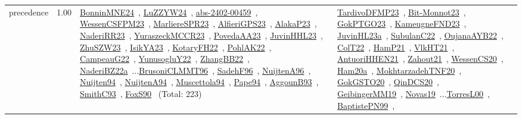 {\begin{longtable}{p{3cm}r>{\raggedright\arraybackslash}p{6cm}>{\raggedright\arraybackslash}p{6cm}>{\raggedright\arraybackslash}p{8cm}}
\index{precedence}\index{Concepts!precedence}precedence &  1.00 & \href{../works/BonninMNE24.pdf}{BonninMNE24}~\cite{BonninMNE24}, \href{../works/LuZZYW24.pdf}{LuZZYW24}~\cite{LuZZYW24}, \href{../works/abs-2402-00459.pdf}{abs-2402-00459}~\cite{abs-2402-00459}, \href{../works/WessenCSFPM23.pdf}{WessenCSFPM23}~\cite{WessenCSFPM23}, \href{../works/MarliereSPR23.pdf}{MarliereSPR23}~\cite{MarliereSPR23}, \href{../works/AlfieriGPS23.pdf}{AlfieriGPS23}~\cite{AlfieriGPS23}, \href{../works/AlakaP23.pdf}{AlakaP23}~\cite{AlakaP23}, \href{../works/NaderiRR23.pdf}{NaderiRR23}~\cite{NaderiRR23}, \href{../works/YuraszeckMCCR23.pdf}{YuraszeckMCCR23}~\cite{YuraszeckMCCR23}, \href{../works/PovedaAA23.pdf}{PovedaAA23}~\cite{PovedaAA23}, \href{../works/JuvinHHL23.pdf}{JuvinHHL23}~\cite{JuvinHHL23}, \href{../works/ZhuSZW23.pdf}{ZhuSZW23}~\cite{ZhuSZW23}, \href{../works/IsikYA23.pdf}{IsikYA23}~\cite{IsikYA23}, \href{../works/KotaryFH22.pdf}{KotaryFH22}~\cite{KotaryFH22}, \href{../works/PohlAK22.pdf}{PohlAK22}~\cite{PohlAK22}, \href{../works/CampeauG22.pdf}{CampeauG22}~\cite{CampeauG22}, \href{../works/YunusogluY22.pdf}{YunusogluY22}~\cite{YunusogluY22}, \href{../works/ZhangBB22.pdf}{ZhangBB22}~\cite{ZhangBB22}, \href{../works/NaderiBZ22a.pdf}{NaderiBZ22a}~\cite{NaderiBZ22a}...\href{../works/BrusoniCLMMT96.pdf}{BrusoniCLMMT96}~\cite{BrusoniCLMMT96}, \href{../works/SadehF96.pdf}{SadehF96}~\cite{SadehF96}, \href{../works/NuijtenA96.pdf}{NuijtenA96}~\cite{NuijtenA96}, \href{../works/Nuijten94.pdf}{Nuijten94}~\cite{Nuijten94}, \href{../works/NuijtenA94.pdf}{NuijtenA94}~\cite{NuijtenA94}, \href{../works/Muscettola94.pdf}{Muscettola94}~\cite{Muscettola94}, \href{../works/Pape94.pdf}{Pape94}~\cite{Pape94}, \href{../works/AggounB93.pdf}{AggounB93}~\cite{AggounB93}, \href{../works/SmithC93.pdf}{SmithC93}~\cite{SmithC93}, \href{../works/FoxS90.pdf}{FoxS90}~\cite{FoxS90} (Total: 223) & \href{../works/TardivoDFMP23.pdf}{TardivoDFMP23}~\cite{TardivoDFMP23}, \href{../works/Bit-Monnot23.pdf}{Bit-Monnot23}~\cite{Bit-Monnot23}, \href{../works/GokPTGO23.pdf}{GokPTGO23}~\cite{GokPTGO23}, \href{../works/KameugneFND23.pdf}{KameugneFND23}~\cite{KameugneFND23}, \href{../works/JuvinHL23a.pdf}{JuvinHL23a}~\cite{JuvinHL23a}, \href{../works/SubulanC22.pdf}{SubulanC22}~\cite{SubulanC22}, \href{../works/OujanaAYB22.pdf}{OujanaAYB22}~\cite{OujanaAYB22}, \href{../works/ColT22.pdf}{ColT22}~\cite{ColT22}, \href{../works/HamP21.pdf}{HamP21}~\cite{HamP21}, \href{../works/VlkHT21.pdf}{VlkHT21}~\cite{VlkHT21}, \href{../works/AntuoriHHEN21.pdf}{AntuoriHHEN21}~\cite{AntuoriHHEN21}, \href{../works/Zahout21.pdf}{Zahout21}~\cite{Zahout21}, \href{../works/WessenCS20.pdf}{WessenCS20}~\cite{WessenCS20}, \href{../works/Ham20a.pdf}{Ham20a}~\cite{Ham20a}, \href{../works/MokhtarzadehTNF20.pdf}{MokhtarzadehTNF20}~\cite{MokhtarzadehTNF20}, \href{../works/GokGSTO20.pdf}{GokGSTO20}~\cite{GokGSTO20}, \href{../works/QinDCS20.pdf}{QinDCS20}~\cite{QinDCS20}, \href{../works/GeibingerMM19.pdf}{GeibingerMM19}~\cite{GeibingerMM19}, \href{../works/Novas19.pdf}{Novas19}~\cite{Novas19}...\href{../works/TorresL00.pdf}{TorresL00}~\cite{TorresL00}, \href{../works/BaptistePN99.pdf}{BaptistePN99}~\cite{BaptistePN99}, 
\end{longtable}}

